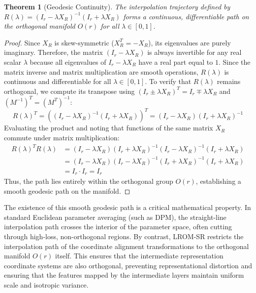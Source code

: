 \documentclass{article}
\theoremstyle{plain}
\newtheorem{theorem}{Theorem}[section]
\theoremstyle{definition}
\theoremstyle{remark}
\begin{document}
\begin{theorem}[Geodesic Continuity]
The interpolation trajectory defined by $R(\lambda) = (I_r - \lambda X_R)^{-1}(I_r + \lambda X_R)$ forms a continuous, differentiable path on the orthogonal manifold $O(r)$ for all $\lambda \in [0, 1]$.
\end{theorem}

\begin{proof}
Since $X_R$ is skew-symmetric ($X_R^T = -X_R$), its eigenvalues are purely imaginary. Therefore, the matrix $(I_r - \lambda X_R)$ is always invertible for any real scalar $\lambda$ because all eigenvalues of $I_r - \lambda X_R$ have a real part equal to $1$. Since the matrix inverse and matrix multiplication are smooth operations, $R(\lambda)$ is continuous and differentiable for all $\lambda \in [0, 1]$. To verify that $R(\lambda)$ remains orthogonal, we compute its transpose using $(I_r \pm \lambda X_R)^T = I_r \mp \lambda X_R$ and $(M^{-1})^T = (M^T)^{-1}$:
\begin{equation*}
R(\lambda)^T = \left( (I_r - \lambda X_R)^{-1}(I_r + \lambda X_R) \right)^T = (I_r - \lambda X_R) (I_r + \lambda X_R)^{-1}
\end{equation*}
Evaluating the product and noting that functions of the same matrix $X_R$ commute under matrix multiplication:
\begin{align*}
R(\lambda)^T R(\lambda) &= (I_r - \lambda X_R) (I_r + \lambda X_R)^{-1} (I_r - \lambda X_R)^{-1} (I_r + \lambda X_R) \\
&= (I_r - \lambda X_R) (I_r - \lambda X_R)^{-1} (I_r + \lambda X_R)^{-1} (I_r + \lambda X_R) \\
&= I_r \cdot I_r = I_r
\end{align*}
Thus, the path lies entirely within the orthogonal group $O(r)$, establishing a smooth geodesic path on the manifold.
\end{proof}

The existence of this smooth geodesic path is a critical mathematical property. In standard Euclidean parameter averaging (such as DPM), the straight-line interpolation path crosses the interior of the parameter space, often cutting through high-loss, non-orthogonal regions. By contrast, LROM-SR restricts the interpolation path of the coordinate alignment transformations to the orthogonal manifold $O(r)$ itself. This ensures that the intermediate representation coordinate systems are also orthogonal, preventing representational distortion and ensuring that the features mapped by the intermediate layers maintain uniform scale and isotropic variance.
\end{document}
